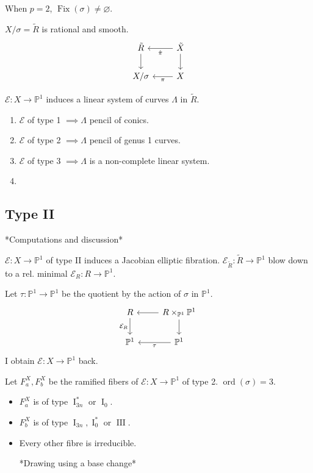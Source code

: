 When $p=2$, $\operatorname{Fix}(\sigma)\neq \varnothing$.

$X/\sigma=\tilde{R}$ is rational and smooth.
\[\begin{tikzcd}
	\tilde{R}\arrow[d]&\tilde{X}\arrow[l,"\hat{\pi}"]\arrow[d]\\
	X/\sigma & X\arrow[l,"\pi"]
\end{tikzcd}\]

$ \mathcal{E}:X\to \mathbb{P}^1$ induces a linear system of curves $\Lambda$ in $\tilde{R}$.

\begin{enumerate}
	\item  $\mathcal{E}$ of type 1 $\implies \Lambda$ pencil of conics.
	\item $\mathcal{E}$ of type 2 $\implies \Lambda$ pencil of genus 1 curves.
	\item $\mathcal{E}$ of type 3 $\implies \Lambda$ is a non-complete linear system.

	\item 
\end{enumerate}

\subsection{Type II}

*Computations and discussion*

$\mathcal{E}:X\to \mathbb{P}^1$ of type  II induces a Jacobian elliptic fibration. $\mathcal{E}_{\tilde{R}}:\tilde{R}\to \mathbb{P}^1$ blow down to a rel. minimal $\mathcal{E}_R:R\to \mathbb{P}^1$.

Let $\tau :\mathbb{P}^1\to \mathbb{P}^1$ be the quotient by the action of $\sigma$ in $\mathbb{P}^1$.
\[\begin{tikzcd}
	R\arrow[d,swap,"\mathcal{E}_R"]& R\times_{\mathbb{P}^1}\mathbb{P}^1\arrow[l]\arrow[d]\\
	\mathbb{P}^1&\mathbb{P}^1\arrow[l,"\tau "]
\end{tikzcd}\]
I obtain $\mathcal{E}:X\to \mathbb{P}^1$ back.

Let $F_a^X,F_b^X$ be the ramified fibers of $\mathcal{E}:X\to \mathbb{P}^1$ of type 2. $\operatorname{ord}(\sigma)=3$.
\begin{itemize}
\item $F^X_a$ is of type $\operatorname{I}^*_{3n}$ or $\operatorname{I}_{0}$.
\item $F^X_b$ is of type $\operatorname{I}_{3n},\operatorname{I}^*_{0}$ or $\operatorname{I I I}$.
\item Every other fibre is irreducible.

	*Drawing using a base change*
\end{itemize}

